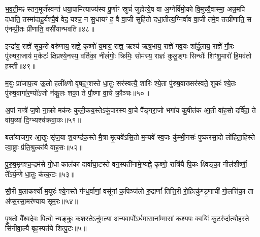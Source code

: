 भ॒व॒ती॒मꣴ स्तन॒मूर्ज॑स्वन्तं धया॒पामित्याज्य॑स्य पू॒र्णाꣳ स्रुचं॑ जुहोत्ये॒ष वा अ॒ग्नेर्वि॑मो॒को वि॒मुच्यै॒वास्मा॒ अन्न॒मपि॑ दधाति॒ तस्मा॑दाहु॒र्यश्चै॒वं वेद॒ यश्च॒ न सु॒धायꣳ॑ ह॒ वै वा॒जी सुहि॑तो दधा॒तीत्य॒ग्निर्वाव वा॒जी तमे॒व तत्प्री॑णाति॒ स ए॑नम्प्री॒तः प्री॑णाति॒ वसी॑यान्भवति॥४८॥

{\anuvakamend[{प्र॒तीची॒ दिक्तस्या᳚स्ते द्वि॒ष्मो यश्च॑ निलि॒म्पा नामे॒ह गृ॒हा इति॑ लू॒क्षो वसी॑यान्भवति॥10॥}]}

इन्द्रा॑य॒ राज्ञे॑ सूक॒रो वरु॑णाय॒ राज्ञे॒ कृष्णो॑ य॒माय॒ राज्ञ॒ ऋश्य॑ ऋष॒भाय॒ राज्ञे॑ गव॒यः शा᳚र्दू॒लाय॒ राज्ञे॑ गौ॒रः पु॑रुषरा॒जाय॑ म॒र्कटः॑ क्षिप्रश्ये॒नस्य॒ वर्ति॑का॒ नीलं॑गोः॒ क्रिमिः॒ सोम॑स्य॒ राज्ञः॑ कुलु॒ङ्गः सिन्धोः᳚ शिꣳशु॒मारो॑ हि॒मव॑तो ह॒स्ती॥४९॥

{\anuvakamend[{इन्द्रा॑या॒ष्टाविꣳ॑शतिः॥11॥}]}

म॒युः प्रा॑जाप॒त्य ऊ॒लो हली᳚क्ष्णो वृषद॒ꣳ॒शस्ते धा॒तुः सर॑स्वत्यै॒ शारिः॑ श्ये॒ता पु॑रुष॒वाख्सर॑स्वते॒ शुकः॑ श्ये॒तः पु॑रुष॒वागा॑र॒ण्यो॑\-ऽजो न॑कु॒लः शका॒ ते पौ॒ष्णा वा॒चे क्रौ॒ञ्चः॥५०॥

{\anuvakamend[{म॒युस्त्रयो॑विꣳशतिः॥12॥}]}

अ॒पां नप्त्रे॑ ज॒षो ना॒क्रो मक॑रः कुली॒कय॒स्ते\-ऽकू॑पारस्य वा॒चे पै᳚ङ्गरा॒जो भगा॑य कु॒षीत॑क आ॒ती वा॑ह॒सो दर्वि॑दा॒ ते वा॑य॒व्या॑ दि॒ग्भ्यश्च॑क्रवा॒कः॥५१॥

{\anuvakamend[{अ॒पामेका॒न्नविꣳ॑शतिः॥13॥}]}

बला॑याजग॒र आ॒खुः सृ॑ज॒या श॒यण्ड॑क॒स्ते मै॒त्रा मृ॒त्यवे॑\-ऽसि॒तो म॒न्यवे᳚ स्व॒जः कु॑म्भी॒नसः॑ पुष्करसा॒दो लो॑हिता॒हिस्ते त्वा॒ष्ट्राः प्र॑ति॒श्रुत्का॑यै वाह॒सः॥५२॥

{\anuvakamend[{}]}

पु॒रु॒ष॒मृ॒गश्च॒न्द्रम॑से गो॒धा काल॑का दार्वाघा॒टस्ते वन॒स्पती॑नामे॒ण्यह्ने॒ कृष्णो॒ रात्रि॑यै पि॒कः क्ष्विङ्का॒ नील॑शीर्ष्णी॒ ते᳚\-ऽर्य॒म्णे धा॒तुः क॑त्क॒टः॥५३॥

{\anuvakamend[{}]}

सौ॒री ब॒लाकर्श्यो॑ म॒यूरः॑ श्ये॒नस्ते ग॑न्ध॒र्वाणां॒ वसू॑नां क॒पिञ्ज॑लो रु॒द्राणां᳚ तित्ति॒री रो॒हित्कु॑ण्डृ॒णाची॑ गो॒लत्ति॑का॒ ता अ॑प्स॒रसा॒मर॑ण्याय सृम॒रः॥५४॥

{\anuvakamend[{}]}

पृ॒ष॒तो वै᳚श्वदे॒वः पि॒त्वो न्यङ्कुः॒ कश॒स्ते\-ऽनु॑मत्या अन्यवा॒पो᳚\-ऽर्धमा॒साना᳚म्मा॒सां क॒श्यपः॒ क्वयिः॑ कु॒टरु॑र्दात्यौ॒हस्ते सि॑नीवा॒ल्यै बृह॒स्पत॑ये शित्पु॒टः॥५॥


